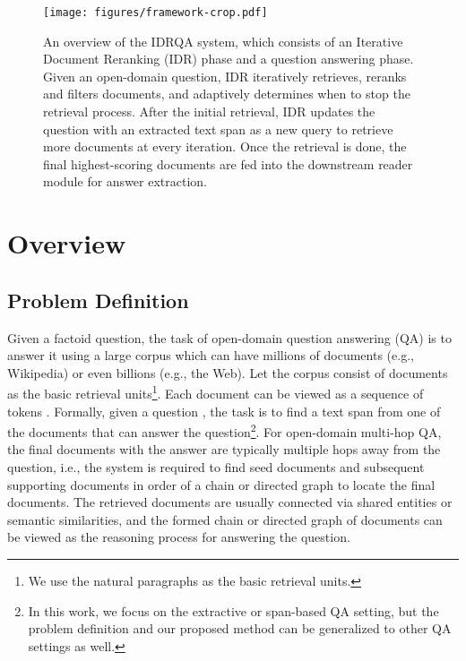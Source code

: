 \documentclass[sigconf]{acmart}
\begin{document}
\begin{figure*}
\center
\texttt{[image: figures/framework-crop.pdf]}
\centering
\caption{An overview of the IDRQA system, which consists of an Iterative Document Reranking (IDR) phase and a question answering phase. Given an open-domain question, IDR iteratively retrieves, reranks and filters documents, and adaptively determines when to stop the retrieval process. After the initial retrieval, IDR updates the question with an extracted text span as a new query to retrieve more documents at every iteration. Once the retrieval is done, the final highest-scoring documents are fed into the downstream reader module for answer extraction.
}
\label{figure:pipeline}
\end{figure*}








\section{Overview}



\subsection{Problem Definition}
Given a factoid question, the task of open-domain question answering (QA) is to answer it using a large corpus which can have millions of documents (e.g., Wikipedia) or even billions (e.g., the Web). Let the corpus  consist of  documents as the basic retrieval units\footnote{We use the natural paragraphs as the basic retrieval units.}. Each document  can be viewed as a sequence of tokens . Formally, given a question , the task is to find a text span  from one of the documents  that can answer the question\footnote{In this work, we focus on the extractive or span-based QA setting, but the problem definition and our proposed method can be generalized to other QA settings as well.}. For open-domain multi-hop QA, the final documents with the answer are typically multiple hops away from the question, i.e., the system is required to find seed documents and subsequent supporting documents in order of a chain or directed graph to locate the final documents. The retrieved documents are usually connected via shared entities or semantic similarities, and the formed chain or directed graph of documents can be viewed as the reasoning process for answering the question.
\end{document}
